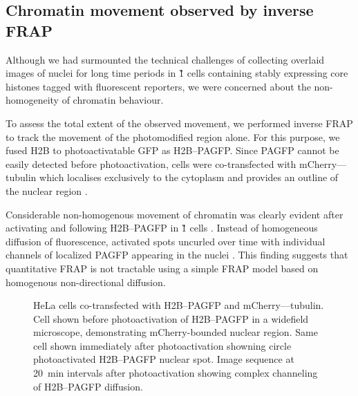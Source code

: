     \subsection{Chromatin movement observed by inverse FRAP}

    Although we had surmounted the technical challenges of collecting 
    overlaid images of nuclei for long time periods 
    in \G1{} cells containing stably expressing core histones tagged with fluorescent reporters,
    we were concerned about the non-homogeneity of chromatin behaviour.

    To assess the total extent of the observed movement, we performed inverse FRAP
    to track the movement of the photomodified region alone.
    For this purpose, we fused H2B to photoactivatable GFP as H2B--PAGFP.
    Since PAGFP cannot be easily detected before photoactivation, 
    cells were co-transfected with mCherry--\textalpha--tubulin 
    which localises exclusively to the cytoplasm 
    and provides an outline of the nuclear region .

    Considerable non-homogenous movement of chromatin was clearly evident 
    after activating and following H2B--PAGFP in \G1{} cells .
    Instead of homogeneous diffusion of fluorescence,
    activated spots uncurled over time with individual channels of
    localized PAGFP appearing in the nuclei .
    This finding suggests that quantitative FRAP is not tractable using 
    a simple FRAP model based on homogenous non-directional diffusion.

    \begin{figure}
      \centering
      \hfill
        {
          HeLa cells co-transfected with H2B--PAGFP and mCherry--\textalpha--tubulin.
           Cell shown before photoactivation of H2B--PAGFP
          in a widefield microscope, demonstrating mCherry-bounded nuclear region.
           Same cell shown immediately after photoactivation
          showning circle photoactivated H2B--PAGFP nuclear spot.
           Image sequence at 20~min intervals
          after photoactivation showing complex channeling of H2B--PAGFP diffusion.
        }
      \label{fig:kill-frap:ifrap}
    \end{figure}
